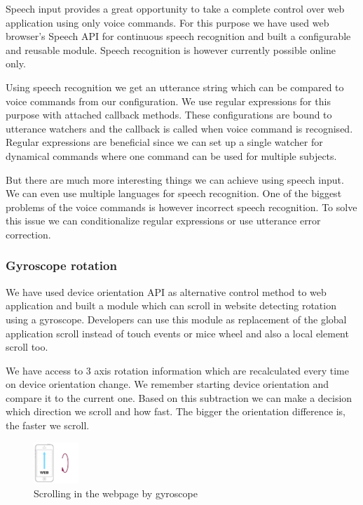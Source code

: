 \documentclass{iitsrc}
\begin{document}
Speech input provides a great opportunity to take a complete control over web application using only voice commands. For this purpose we have used web browser's Speech API for continuous speech recognition and built a configurable and reusable module. Speech recognition is however currently possible online only.

Using speech recognition we get an utterance string which can be compared to voice commands from our configuration. We use regular expressions for this purpose with attached callback methods. These configurations are bound to utterance watchers and the callback is called when voice command is recognised. Regular expressions are beneficial since we can set up a single watcher for dynamical commands where one command can be used for multiple subjects.

But there are much more interesting things we can achieve using speech input. We can even use multiple languages for speech recognition. One of the biggest problems of the voice commands is however incorrect speech recognition. To solve this issue we can conditionalize regular expressions or use utterance error correction.


\subsubsection*{Gyroscope rotation} %
\label{ssub:gyroscope_rotation}

We have used device orientation API as alternative control method to web application and built a module which can scroll in website detecting rotation using a gyroscope. Developers can use this module as replacement of the global application scroll instead of touch events or mice wheel and also a local element scroll too.

We have access to 3 axis rotation information which are recalculated every time on device orientation change. We remember starting device orientation and compare it to the current one. Based on this subtraction we can make a decision which direction we scroll and how fast. The bigger the orientation difference is, the faster we scroll.

\begin{figure}[ht]
    \begin{center}
        \includegraphics[width=0.15\textwidth]{../images/gyroscope}
        \caption{Scrolling in the webpage by gyroscope}
        \label{fig:gyroscope}
    \end{center}
\end{figure}
\end{document}
